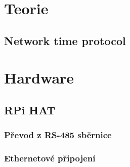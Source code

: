 \section{Teorie}
\subsection{Network time protocol}
\section{Hardware}
\subsection{RPi HAT}
\subsubsection{Převod z RS-485 sběrnice}
\subsubsection{Ethernetové připojení}
